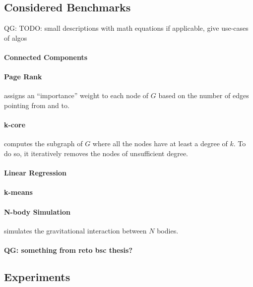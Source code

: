 \documentclass[conference,10pt,a4paper]{IEEEtran}
\newcommand{\qg}[1]{{\color{blue} QG: #1}} %
\begin{document}
\subsection{Considered Benchmarks}

\qg{TODO: small descriptions with math equations if applicable, give use-cases of algos}

\paragraph{Connected Components}

\paragraph{Page Rank}

assigns an ``importance'' weight to each node of $G$ based on the number of edges pointing from and to.

\paragraph{k-core}

computes the subgraph of $G$ where all the nodes have at least a degree of $k$.
To do so, it iteratively removes the nodes of unsufficient degree.

\paragraph{Linear Regression}

\paragraph{k-means}

\paragraph{N-body Simulation}

simulates the gravitational interaction between $N$ bodies.


\paragraph{\qg{something from reto bsc thesis?}}

\subsection{Experiments}
\end{document}
